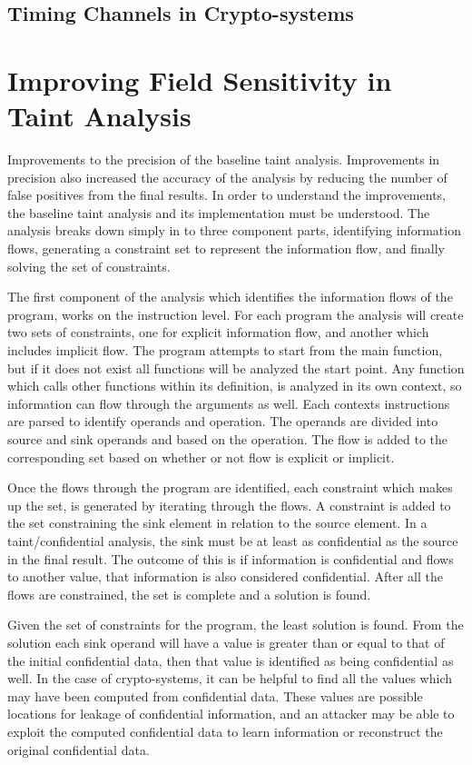 \documentclass[11pt,a4paper]{article}
\begin{document}
\subsection{Timing Channels in Crypto-systems}

\section{Improving Field Sensitivity in Taint Analysis}
Improvements to the precision of the baseline taint analysis. Improvements in
precision also increased the accuracy of the analysis by reducing the number of
false positives from the final results. In order to understand the improvements,
the baseline taint analysis and its implementation must be understood. The
analysis breaks down simply in to three component parts, identifying information
flows, generating a constraint set to represent the information flow, and
finally solving the set of constraints.

The first component of the analysis which identifies the information flows of
the program, works on the instruction level. For each program the analysis will
create two sets of constraints, one for explicit information flow, and another
which includes implicit flow. The program attempts to start from the main
function, but if it does not exist all functions will be analyzed the start
point. Any function which calls other functions within its definition, is
analyzed in its own context, so information can flow through the arguments as
well. Each contexts instructions are parsed to identify operands and operation.
The operands are divided into source and sink operands and based on the
operation. The flow is added to the corresponding set based on whether or not
flow is explicit or implicit.

Once the flows through the program are identified, each constraint which makes
up the set, is generated by iterating through the flows. A constraint is added
to the set constraining the sink element in relation to the source element. In a
taint/confidential analysis, the sink must be at least as confidential as the
source in the final result. The outcome of this is if information is
confidential and flows to another value, that information is also considered
confidential. After all the flows are constrained, the set is complete and a
solution is found.

Given the set of constraints for the program, the least solution is found. From
the solution each sink operand will have a value is greater than or equal to
that of the initial confidential data, then that value is identified as being
confidential as well. In the case of crypto-systems, it can be helpful to find
all the values which may have been computed from confidential data. These values
are possible locations for leakage of confidential information, and an attacker
may be able to exploit the computed confidential data to learn information or
reconstruct the original confidential data.
\end{document}
